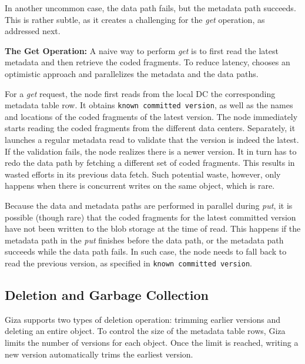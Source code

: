 In another uncommon case, the data path fails, but the metadata path succeeds.
This is rather subtle, as it creates a challenging for the {\em get} operation,
as addressed next.

{\bf The Get Operation:}
A naive way to perform {\em get} is to first read the latest metadata and then retrieve the coded fragments.
To reduce latency, {\name} chooses an optimistic approach and parallelizes the metadata and the data paths.

For a {\em get} request, the {\name} node first reads from the local DC the corresponding metadata table row.
It obtains {\tt known committed version}, as well as the names and locations of the coded fragments of the latest version.
The \name node immediately starts reading the coded fragments from the different data centers.
Separately, it launches a regular metadata read to validate that the version is indeed the latest.
If the validation fails, the \name node realizes there is a newer version.
It in turn has to redo the data path by fetching a different set of coded fragments.
This results in wasted efforts in its previous data fetch.
Such potential waste, however, only happens when there is concurrent writes on the same object,
which is rare.

Because the data and metadata paths are performed in parallel during {\em put},
it is possible (though rare) that the coded fragments for the latest committed version
have not been written to the blob storage at the time of read.
This happens if the metadata path in the {\em put} finishes before the data path,
or the metadata path succeeds while the data path fails.
In such case, the {\name} node needs to fall back to read the previous version,
as specified in {\tt known committed version}.


\subsection{Deletion and Garbage Collection}

Giza supports two types of deletion operation: trimming earlier versions and deleting an entire object.
To control the size of the metadata table rows, Giza limits the number of versions for each object.
Once the limit is reached, writing a new version automatically trims the earliest version.


